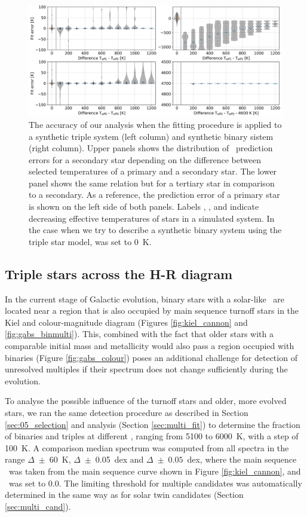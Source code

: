\begin{figure}
	\centering
	\includegraphics[width=\textwidth]{three_stars_fit_sim_res_comb.png}
	\caption{The accuracy of our analysis when the fitting procedure is applied to a synthetic triple system (left column) and synthetic binary sistem (right column). Upper panels shows the distribution of \Teff\ prediction errors for a secondary star depending on the difference between selected temperatures of a primary and a secondary star. The lower panel shows the same relation but for a tertiary star in comparison to a secondary. As a reference, the prediction error of a primary star is shown on the left side of both panels. Labels , , and  indicate decreasing effective temperatures of stars in a simulated system. In the case when we try to describe a synthetic binary system using the triple star model,   was set to $0$~K.}
	\label{fig:triple_sym_res}
\end{figure}

\subsection{Triple stars across the H-R diagram}
In the current stage of Galactic evolution, binary stars with a solar-like \Teff\ are located near a region that is also occupied by main sequence turnoff stars in the Kiel and colour-magnitude diagram (Figures \ref{fig:kiel_cannon} and \ref{fig:gabs_binmulti}). This, combined with the fact that older stars with a comparable initial mass and metallicity would also pass a region occupied with binaries (Figure \ref{fig:gabs_colour}) poses an additional challenge for detection of unresolved multiples if their spectrum does not change sufficiently during the evolution.

To analyse the possible influence of the turnoff stars and older, more evolved stars, we ran the same detection procedure as described in Section \ref{sec:05_selection} and analysis (Section \ref{sec:multi_fit}) to determine the fraction of binaries and triples at different \Teff, ranging from 5100 to 6000~K, with a step of 100~K. A comparison median spectrum was computed from all spectra in the range $\Delta$\Teff~$\pm$~60~K, $\Delta$\Logg~$\pm$~0.05~dex and $\Delta$\Feh~$\pm $~$0.05$~dex, where the main sequence \Logg\ was taken from the main sequence curve shown in Figure \ref{fig:kiel_cannon}, and \Feh\ was set to $0.0$. The limiting threshold for multiple candidates was automatically determined in the same way as for solar twin candidates (Section \ref{sec:multi_cand}).

